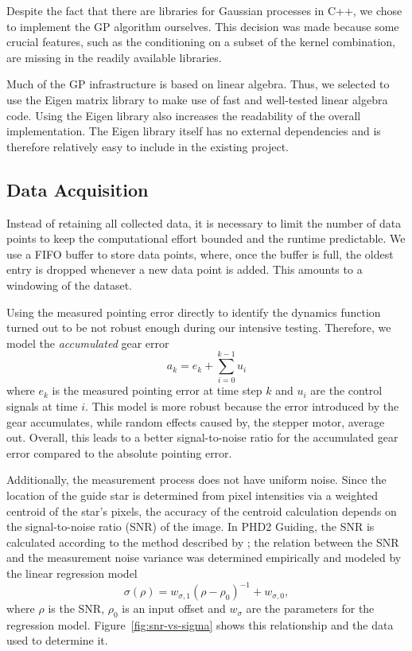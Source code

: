 Despite the fact that there are libraries for Gaussian processes in C++, we
chose to implement the GP algorithm ourselves. This decision was made because
some crucial features, such as the conditioning on a subset of the kernel
combination, are missing in the readily available libraries.

Much of the GP infrastructure is based on linear algebra. Thus, we selected to
use the Eigen matrix library \cite{Guennebaud.Jacobs.ea:2010:Eigen} to make
use of fast and well-tested linear algebra code. Using the Eigen library also
increases the readability of the overall implementation. The Eigen library
itself has no external dependencies and is therefore relatively easy to include
in the existing project.

\subsection{Data Acquisition}

Instead of retaining all collected data, it is necessary to limit the number
of data points to keep the computational effort bounded and the runtime
predictable. We use a FIFO buffer to store data points, where, once the buffer
is full, the oldest entry is dropped whenever a new data point is added. This
amounts to a windowing of the dataset.

Using the measured pointing error directly to identify the dynamics function
turned out to be not robust enough during our intensive testing. Therefore, we
model the \emph{accumulated} gear error
\begin{equation}
  \label{eq:accumulation-model}
 a_{k} = e_k + \sum_{i=0}^{k-1} u_i
\end{equation}
where $e_k$ is the measured pointing error at time step $k$ and $u_i$ are the
control signals at time $i$. This model is more robust because the error
introduced by the gear accumulates, while random effects caused by, \eg
the stepper motor, average out. Overall, this leads to a better
signal-to-noise ratio for the accumulated gear error compared to the absolute
pointing error.

Additionally, the measurement process does not have uniform noise. Since the
location of the guide star is determined from pixel intensities via a weighted
centroid of the star's pixels, the accuracy of the centroid calculation depends
on the signal-to-noise ratio (SNR) of the image. In PHD2 Guiding, the SNR is
calculated according to the method described by
\textcite{Simonetti:2004:Measuring}; the relation between the SNR and the
measurement noise variance was determined empirically and modeled by the linear
regression model
\begin{equation}
  \sigma(\rho) = w_{\sigma,1}(\rho - \rho_0)^{-1} + w_{\sigma,0},
\end{equation}
where $\rho$ is the SNR, $\rho_0$ is an input offset and $w_{\sigma}$ are the
parameters for the regression model. Figure~\ref{fig:snr-vs-sigma} shows this
relationship and the data used to determine it.

